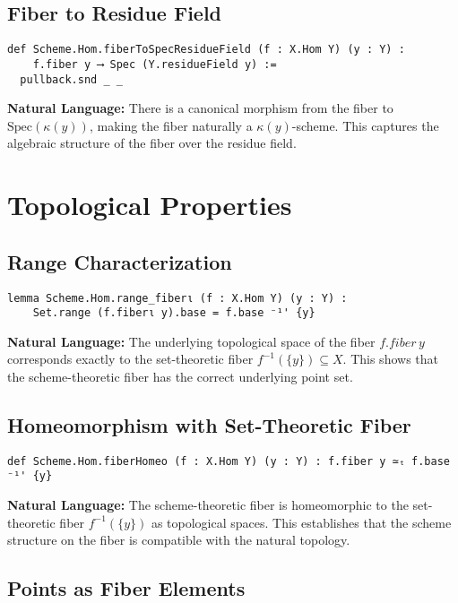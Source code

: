 \documentclass{article}
\theoremstyle{definition}
\begin{document}
\subsection{Fiber to Residue Field}

\begin{lstlisting}
def Scheme.Hom.fiberToSpecResidueField (f : X.Hom Y) (y : Y) :
    f.fiber y ⟶ Spec (Y.residueField y) :=
  pullback.snd _ _
\end{lstlisting}

\textbf{Natural Language:} There is a canonical morphism from the fiber to $\mathrm{Spec}(\kappa(y))$, making the fiber naturally a $\kappa(y)$-scheme. This captures the algebraic structure of the fiber over the residue field.

\section{Topological Properties}

\subsection{Range Characterization}

\begin{lstlisting}
lemma Scheme.Hom.range_fiberι (f : X.Hom Y) (y : Y) :
    Set.range (f.fiberι y).base = f.base ⁻¹' {y}
\end{lstlisting}

\textbf{Natural Language:} The underlying topological space of the fiber $f.fiber\, y$ corresponds exactly to the set-theoretic fiber $f^{-1}(\{y\}) \subseteq X$. This shows that the scheme-theoretic fiber has the correct underlying point set.

\subsection{Homeomorphism with Set-Theoretic Fiber}

\begin{lstlisting}
def Scheme.Hom.fiberHomeo (f : X.Hom Y) (y : Y) : f.fiber y ≃ₜ f.base ⁻¹' {y}
\end{lstlisting}

\textbf{Natural Language:} The scheme-theoretic fiber is homeomorphic to the set-theoretic fiber $f^{-1}(\{y\})$ as topological spaces. This establishes that the scheme structure on the fiber is compatible with the natural topology.

\subsection{Points as Fiber Elements}
\end{document}
